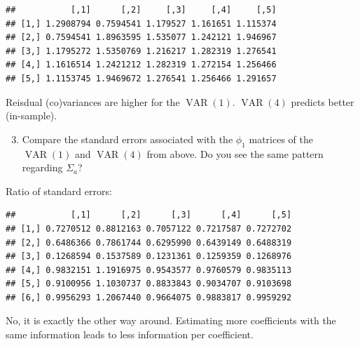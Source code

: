 \documentclass[12pt,a4paper]{article}
\newcommand{\VAR}{\operatorname{VAR}} %
\newenvironment{Shaded}{\begin{snugshade}}{\end{snugshade}}
\newcommand{\DecValTok}[1]{\textcolor[rgb]{0.00,0.00,0.81}{#1}}
\newcommand{\NormalTok}[1]{#1}
\newcommand{\OperatorTok}[1]{\textcolor[rgb]{0.81,0.36,0.00}{\textbf{#1}}}
\newcommand{\StringTok}[1]{\textcolor[rgb]{0.31,0.60,0.02}{#1}}
\begin{document}
\begin{Shaded}
\end{Shaded}

\begin{verbatim}
##           [,1]      [,2]     [,3]     [,4]     [,5]
## [1,] 1.2908794 0.7594541 1.179527 1.161651 1.115374
## [2,] 0.7594541 1.8963595 1.535077 1.242121 1.946967
## [3,] 1.1795272 1.5350769 1.216217 1.282319 1.276541
## [4,] 1.1616514 1.2421212 1.282319 1.272154 1.256466
## [5,] 1.1153745 1.9469672 1.276541 1.256466 1.291657
\end{verbatim}

Reisdual (co)variances are higher for the \(\VAR(1)\). \(\VAR(4)\)
predicts better (in-sample).

\begin{enumerate}[label=(\roman*)]
    \setcounter{enumi}{2}
    \item Compare the standard errors associated with the $\phi_1$ matrices of the $\VAR(1)$ and $\VAR(4)$ from above. Do you see the same pattern regarding $\Sigma_a$? 
  \end{enumerate}

Ratio of standard errors:

\begin{Shaded}
\end{Shaded}

\begin{verbatim}
##           [,1]      [,2]      [,3]      [,4]      [,5]
## [1,] 0.7270512 0.8812163 0.7057122 0.7217587 0.7272702
## [2,] 0.6486366 0.7861744 0.6295990 0.6439149 0.6488319
## [3,] 0.1268594 0.1537589 0.1231361 0.1259359 0.1268976
## [4,] 0.9832151 1.1916975 0.9543577 0.9760579 0.9835113
## [5,] 0.9100956 1.1030737 0.8833843 0.9034707 0.9103698
## [6,] 0.9956293 1.2067440 0.9664075 0.9883817 0.9959292
\end{verbatim}

No, it is exactly the other way around. Estimating more coefficients
with the same information leads to less information per coefficient.
\end{document}
